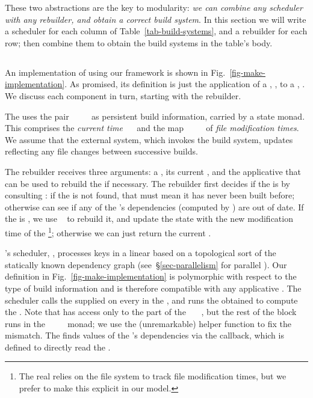 These two abstractions are the key to modularity: \emph{we can combine any
scheduler with any rebuilder, and obtain a correct build system}.
In this section we will write a scheduler for each column of
Table~\ref{tab-build-systems}, and a rebuilder for each row; then combine them
to obtain the build systems in the table's body.

\subsection{\Make}\label{sec-implementation-make}

An implementation of \Make using our framework is shown in
Fig.~\ref{fig-make-implementation}. As promised, its definition
is just the application of a , ,
to a , .
We discuss each component in turn, starting with the rebuilder.

The  uses the pair
~~\hs{=}~~ as persistent
build information, carried by a state monad. This  comprises
the \emph{current time} ~\hs{::}~ and the map
~\hs{::}~~~ of \emph{file modification
times}. We assume that the external system, which invokes the build system,
updates  reflecting any file changes between successive builds.

The rebuilder receives three arguments: a , its current , and
the applicative  that can be used to rebuild the  if necessary.
The rebuilder first decides if the  is  by consulting
: if the  is not found, that must mean it has never been
built before; otherwise  can see if any of the 's
dependencies (computed by ) are out of date. If the  is
, we use ~ to rebuild it, and update the state with
the new modification time of the \footnote{The real \Make relies on the
file system to track file modification times, but we prefer to make this
explicit in our model.}; otherwise we can just return the current .

\Make's scheduler, , processes keys in a linear  based
on a topological sort of the statically known dependency graph
(see~\S\ref{sec-parallelism} for parallel \Make). Our definition in
Fig.~\ref{fig-make-implementation} is polymorphic with respect to the type of
build information  and is therefore compatible with any applicative
. The scheduler calls the supplied  on every
 in the , and runs the obtained  to compute the
. Note that  has access only to the  part of the
~~~, but the rest of the  block runs in the
~~~~ monad; we use the (unremarkable)
helper function  to fix the mismatch. The  finds
values of the 's dependencies via the  callback, which is
defined to directly read the .

